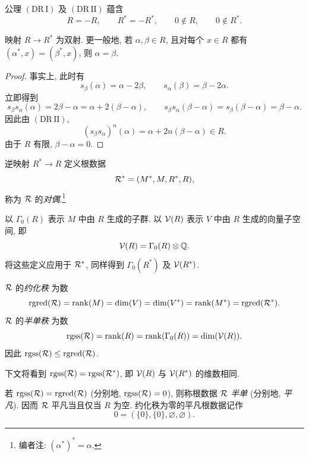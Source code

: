 \begin{remark}\label{sga3:XXI:1.1.3}
公理 \((\mathrm{DR\,I})\) 及 \((\mathrm{DR\,II})\) 蕴含
\[
 R=-R,\qquad R^\ast=-R^\ast,\qquad
 0\notin R,\qquad 0\notin R^\ast.
\]
\end{remark}

\begin{lemma}\label{sga3:XXI:1.1.4}
映射 \(R\to R^\ast\) 为双射. 更一般地, 若 \(\alpha,\beta\in R\), 且对每个 \(x\in R\) 都有 \((\alpha^\ast,x)=(\beta^\ast,x)\), 则 \(\alpha=\beta\).
\end{lemma}
\begin{proof}
事实上, 此时有
\[
 s_\beta(\alpha)=\alpha-2\beta,\qquad
 s_\alpha(\beta)=\beta-2\alpha.
\]
立即得到
\[
 s_\beta s_\alpha(\alpha)
   =2\beta-\alpha=\alpha+2(\beta-\alpha),\qquad
 s_\beta s_\alpha(\beta-\alpha)
   =s_\beta(\beta-\alpha)=\beta-\alpha.
\]
因此由 \((\mathrm{DR\,II})\),
\[
 (s_\beta s_\alpha)^n(\alpha)
   =\alpha+2n(\beta-\alpha)\in R.
\]
由于 \(R\) 有限, \(\beta-\alpha=0\).
\end{proof}

\begin{corollary}\label{sga3:XXI:1.1.5}
逆映射 \(R^\ast\to R\) 定义根数据
\[
 \mathcal{R}^\ast=(M^\ast,M,R^\ast,R),
\]
称为 \(\mathcal{R}\) 的\emph{对偶}.\footnote{编者注: \((\alpha^\ast)^\ast=\alpha\).}
\end{corollary}

\begin{definition}\label{sga3:XXI:1.1.6}
以 \(\Gamma_0(R)\) 表示 \(M\) 中由 \(R\) 生成的子群. 以 \(\mathcal{V}(R)\) 表示 \(V\) 中由 \(R\) 生成的向量子空间, 即
\[
 \mathcal{V}(R)=\Gamma_0(R)\otimes\mathbb Q.
\]
将这些定义应用于 \(\mathcal{R}^\ast\), 同样得到 \(\Gamma_0(R^\ast)\) 及 \(\mathcal{V}(R^\ast)\).

\(\mathcal{R}\) 的\emph{约化秩} 为数
\[
 \operatorname{rgred}(\mathcal{R})
 =\operatorname{rank}(M)=\dim(V)=\dim(V^\ast)=\operatorname{rank}(M^\ast)=\operatorname{rgred}(\mathcal{R}^\ast).
\]
\(\mathcal{R}\) 的\emph{半单秩} 为数
\[
 \operatorname{rgss}(\mathcal{R})
 =\operatorname{rank}(R)=\operatorname{rank}(\Gamma_0(R))=\dim(\mathcal{V}(R)).
\]
因此 \(\operatorname{rgss}(\mathcal{R})\leq\operatorname{rgred}(\mathcal{R})\).

下文将看到 \(\operatorname{rgss}(\mathcal{R})=\operatorname{rgss}(\mathcal{R}^\ast)\), 即 \(\mathcal{V}(R)\) 与 \(\mathcal{V}(R^\ast)\) 的维数相同.
\end{definition}

\begin{definition}\label{sga3:XXI:1.1.7}\leavevmode\par
若 \(\operatorname{rgss}(\mathcal{R})=\operatorname{rgred}(\mathcal{R})\) (分别地, \(\operatorname{rgss}(\mathcal{R})=0\)), 则称根数据 \(\mathcal{R}\) \emph{半单} (分别地, \emph{平凡}). 因而 \(\mathcal{R}\) 平凡当且仅当 \(R\) 为空. 约化秩为零的平凡根数据记作
\[
 0=(\{0\},\{0\},\varnothing,\varnothing).
\]
\end{definition}

